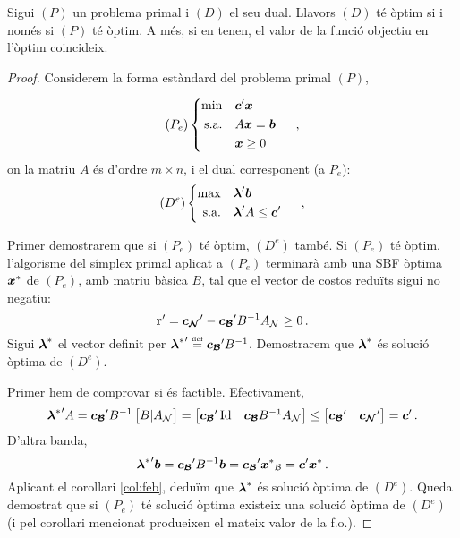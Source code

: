 \begin{teo}\label{teo:dualitat-fort}
	Sigui $\left(P\right)$ un problema primal i $\left(D\right)$ el seu dual.
	Llavors $(D)$ té òptim si i només si $(P)$ té òptim. A més, si en tenen, el
	valor de la funció objectiu en l'òptim coincideix.
	\begin{proof}
		Considerem la forma estàndard del problema primal $(P)$,
		
		\[
		(P_e)
		\begin{cases}
		\begin{aligned}
		\min 			&&& \boldsymbol{c}'\boldsymbol{x}\\
		\text{s.a.}		&&& A\boldsymbol{x} = \boldsymbol{b}\\
		&&& \boldsymbol{x}\ge0
		\end{aligned}
		\end{cases}\ ,
		\]
		on la matriu $A$ és d'ordre $m\times n$, i el dual corresponent (a 
		$P_e$):
		\[
		(D^e)
		\begin{cases}
		\begin{aligned}
		\max 			&&& \boldsymbol{\lambda}'\boldsymbol{b}\\
		\text{s.a.}		&&& \boldsymbol{\lambda}'A \le \boldsymbol{c}'
		\end{aligned}
		\end{cases}\ ,
		\]
		
		Primer demostrarem que si $(P_e)$ té òptim, $(D^e)$ també. Si $(P_e)$ té
		òptim, l'algorisme del símplex primal aplicat a $(P_e)$ terminarà amb 
		una SBF
		òptima $\boldsymbol{x}^\ast$ de $(P_e)$, amb matriu bàsica $B$, tal que el 
		vector de
		costos reduïts sigui no negatiu: \[\mathbf{r}' = \boldsymbol{c_{\mathcal{N}}} '- 
		\boldsymbol{c_{\mathcal{B}}}' B^{-1}
		A_{\mathcal{N}} \ge 0\,.\] Sigui $\boldsymbol{\lambda}^\ast$ el vector definit per
		${\boldsymbol{\lambda}^\ast}'\stackrel{\text{\tiny def}}{=} \boldsymbol{c_{\mathcal{B}}}'B^{-1}$. Demostrarem que
		$\boldsymbol{\lambda}^\ast$ és solució òptima de $(D^e)$.
		
		Primer hem de comprovar si és factible. Efectivament, 
		\[
		{\boldsymbol{\lambda}^\ast}'A = 
		\boldsymbol{c_{\mathcal{B}}}' B^{-1}
		\begin{bmatrix}
		B 	\vert 	A_{\mathcal{N}}
		\end{bmatrix} =
		\begin{bmatrix}
		\boldsymbol{c_{\mathcal{B}}}' \operatorname{Id} & \boldsymbol{c_{\mathcal{B}}} B^{-1} A_{\mathcal{N}}    			
		\end{bmatrix}
		\le
		\begin{bmatrix}
		\boldsymbol{c_{\mathcal{B}}}' 	&\boldsymbol{c_{\mathcal{N}}}'
		\end{bmatrix}
		= \boldsymbol{c}'\,.
		\]
		D'altra banda, \[{\boldsymbol{\lambda}^\ast}'\boldsymbol{b} = \boldsymbol{c_{\mathcal{B}}}' B^{-1} \boldsymbol{b} =
		\boldsymbol{c_{\mathcal{B}}}' {\boldsymbol{x}^\ast}_{\mathcal{B}} = \boldsymbol{c}'{\boldsymbol{x}^\ast}\,. \] Aplicant el 
		corol\lgem lari
		\ref{col:feb}, deduïm que $\boldsymbol{\lambda}^\ast$ és solució òptima de 
		$(D^e)$.
		Queda demostrat que si $(P_e)$ té solució òptima existeix una solució 
		òptima de
		$(D^e)$ (i pel corol\lgem lari mencionat produeixen el mateix valor de 
		la 
		f.o.).
		

\end{proof}
\end{teo}
